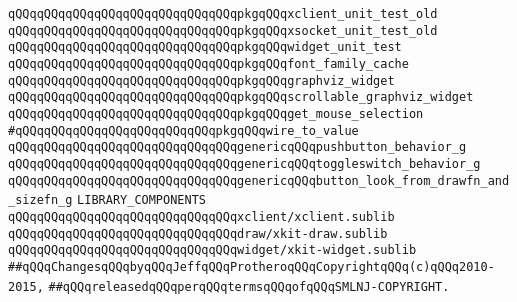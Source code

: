 \verb|qQQqqQQqqQQqqQQqqQQqqQQqqQQqqQQqpkgqQQqxclient_unit_test_old|\newline
\verb|qQQqqQQqqQQqqQQqqQQqqQQqqQQqqQQqpkgqQQqxsocket_unit_test_old|\newline
\verb|qQQqqQQqqQQqqQQqqQQqqQQqqQQqqQQqpkgqQQqwidget_unit_test|\newline
\verb|qQQqqQQqqQQqqQQqqQQqqQQqqQQqqQQqpkgqQQqfont_family_cache|\newline
\verb|qQQqqQQqqQQqqQQqqQQqqQQqqQQqqQQqpkgqQQqgraphviz_widget|\newline
\verb|qQQqqQQqqQQqqQQqqQQqqQQqqQQqqQQqpkgqQQqscrollable_graphviz_widget|\newline
\verb|qQQqqQQqqQQqqQQqqQQqqQQqqQQqqQQqpkgqQQqget_mouse_selection|\newline
\verb|#qQQqqQQqqQQqqQQqqQQqqQQqqQQqpkgqQQqwire_to_value|\newline
\newline
\verb|qQQqqQQqqQQqqQQqqQQqqQQqqQQqqQQqgenericqQQqpushbutton_behavior_g|\newline
\verb|qQQqqQQqqQQqqQQqqQQqqQQqqQQqqQQqgenericqQQqtoggleswitch_behavior_g|\newline
\verb|qQQqqQQqqQQqqQQqqQQqqQQqqQQqqQQqgenericqQQqbutton_look_from_drawfn_and_sizefn_g|\newline
\newline
\verb|LIBRARY_COMPONENTS|\newline
\verb|qQQqqQQqqQQqqQQqqQQqqQQqqQQqqQQqxclient/xclient.sublib|\newline
\verb|qQQqqQQqqQQqqQQqqQQqqQQqqQQqqQQqdraw/xkit-draw.sublib|\newline
\verb|qQQqqQQqqQQqqQQqqQQqqQQqqQQqqQQqwidget/xkit-widget.sublib|\newline
\newline
\verb|##qQQqChangesqQQqbyqQQqJeffqQQqProtheroqQQqCopyrightqQQq(c)qQQq2010-2015,|\newline
\verb|##qQQqreleasedqQQqperqQQqtermsqQQqofqQQqSMLNJ-COPYRIGHT.|\newline

